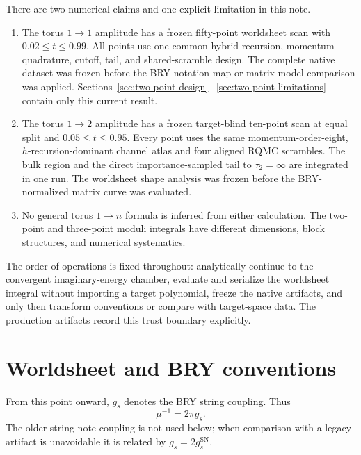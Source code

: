 \documentclass[11pt]{article}
\begin{document}
There are two numerical claims and one explicit limitation in this note.
\begin{enumerate}
  \item The torus $1\to1$ amplitude has a frozen fifty-point worldsheet scan
  with $0.02\leq t\leq0.99$.  All points use one common hybrid-recursion,
  momentum-quadrature, cutoff, tail, and shared-scramble design.  The complete
  native dataset was frozen before the BRY notation map or matrix-model
  comparison was applied.  Sections~\ref{sec:two-point-design}--
  \ref{sec:two-point-limitations} contain only this current result.

  \item The torus $1\to2$ amplitude has a frozen target-blind ten-point scan
  at equal split and $0.05\leq t\leq0.95$.  Every point uses the same
  momentum-order-eight, $h$-recursion-dominant channel atlas and four aligned
  RQMC scrambles.  The bulk region and the direct importance-sampled tail to
  $\tau_2=\infty$ are integrated in one run.  The worldsheet shape analysis
  was frozen before the BRY-normalized matrix curve was evaluated.

  \item No general torus $1\to n$ formula is inferred from either calculation.
  The two-point and three-point moduli integrals have different dimensions,
  block structures, and numerical systematics.
\end{enumerate}

The order of operations is fixed throughout: analytically continue to the
convergent imaginary-energy chamber, evaluate and serialize the worldsheet
integral without importing a target polynomial, freeze the native artifacts,
and only then transform conventions or compare with target-space data.  The
production artifacts record this trust boundary explicitly.

\section{Worldsheet and BRY conventions}
\label{sec:conventions}

From this point onward, \(g_s\) denotes the BRY string coupling.  Thus
\begin{equation}
 \boxed{\mu^{-1}=2\pi g_s.}
 \label{eq:bry-coupling-dictionary}
\end{equation}
The older string-note coupling is not used below; when comparison with a
legacy artifact is unavoidable it is related by
\(g_s=2g_s^{\mathrm{SN}}\).
\end{document}
